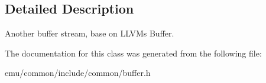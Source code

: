 \subsection{Detailed Description}
Another buffer stream, base on L\+L\+VM\textquotesingle{}s Buffer. 

The documentation for this class was generated from the following file\+:\begin{DoxyCompactItemize}
\item 
emu/common/include/common/buffer.\+h\end{DoxyCompactItemize}
